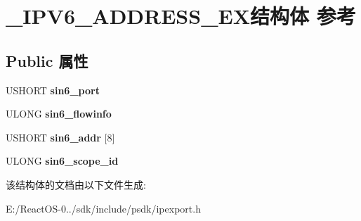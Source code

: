\hypertarget{struct___i_p_v6___a_d_d_r_e_s_s___e_x}{}\section{\+\_\+\+I\+P\+V6\+\_\+\+A\+D\+D\+R\+E\+S\+S\+\_\+\+E\+X结构体 参考}
\label{struct___i_p_v6___a_d_d_r_e_s_s___e_x}
\subsection*{Public 属性}
\begin{DoxyCompactItemize}
\item 
\mbox{\label{struct___i_p_v6___a_d_d_r_e_s_s___e_x_a8e1fa28bf1949bfe717ea71d0ea0bb01}} 
U\+S\+H\+O\+RT {\bfseries sin6\+\_\+port}
\item 
\mbox{\label{struct___i_p_v6___a_d_d_r_e_s_s___e_x_a810c67f8674c017149a61dc5878724ac}} 
U\+L\+O\+NG {\bfseries sin6\+\_\+flowinfo}
\item 
\mbox{\label{struct___i_p_v6___a_d_d_r_e_s_s___e_x_a96b869be378ecd4a41b6f401424e47dd}} 
U\+S\+H\+O\+RT {\bfseries sin6\+\_\+addr} \mbox{[}8\mbox{]}
\item 
\mbox{\label{struct___i_p_v6___a_d_d_r_e_s_s___e_x_af50826a4532e2f5b0ac4c4a5201d525e}} 
U\+L\+O\+NG {\bfseries sin6\+\_\+scope\+\_\+id}
\end{DoxyCompactItemize}


该结构体的文档由以下文件生成\+:\begin{DoxyCompactItemize}
\item 
E\+:/\+React\+O\+S-\/0../sdk/include/psdk/ipexport.\+h\end{DoxyCompactItemize}
